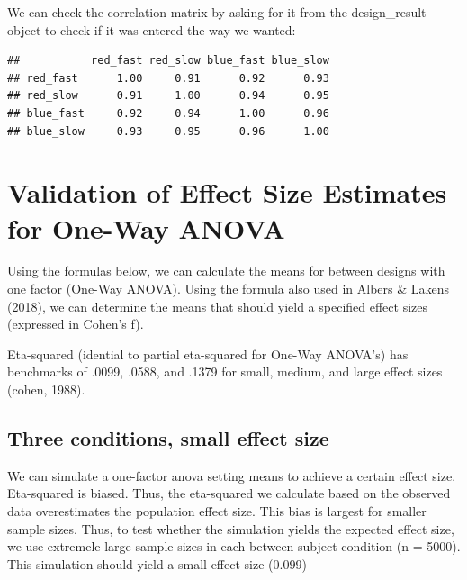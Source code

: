 \documentclass[]{book}
\newenvironment{Shaded}{\begin{snugshade}}{\end{snugshade}}
\newcommand{\NormalTok}[1]{#1}
\newcommand{\OperatorTok}[1]{\textcolor[rgb]{0.81,0.36,0.00}{\textbf{#1}}}
\begin{document}
We can check the correlation matrix by asking for it from the design\_result object to check if it was entered the way we wanted:

\begin{Shaded}
\end{Shaded}

\begin{verbatim}
##           red_fast red_slow blue_fast blue_slow
## red_fast      1.00     0.91      0.92      0.93
## red_slow      0.91     1.00      0.94      0.95
## blue_fast     0.92     0.94      1.00      0.96
## blue_slow     0.93     0.95      0.96      1.00
\end{verbatim}

\hypertarget{validation-of-effect-size-estimates-for-one-way-anova}{%
\chapter{Validation of Effect Size Estimates for One-Way ANOVA}\label{validation-of-effect-size-estimates-for-one-way-anova}}

Using the formulas below, we can calculate the means for between designs with one factor (One-Way ANOVA). Using the formula also used in Albers \& Lakens (2018), we can determine the means that should yield a specified effect sizes (expressed in Cohen's f).

Eta-squared (idential to partial eta-squared for One-Way ANOVA's) has benchmarks of .0099, .0588, and .1379 for small, medium, and large effect sizes (cohen, 1988).

\hypertarget{three-conditions-small-effect-size}{%
\section{Three conditions, small effect size}\label{three-conditions-small-effect-size}}

We can simulate a one-factor anova setting means to achieve a certain effect size. Eta-squared is biased. Thus, the eta-squared we calculate based on the observed data overestimates the population effect size. This bias is largest for smaller sample sizes. Thus, to test whether the simulation yields the expected effect size, we use extremele large sample sizes in each between subject condition (n = 5000). This simulation should yield a small effect size (0.099)
\end{document}
